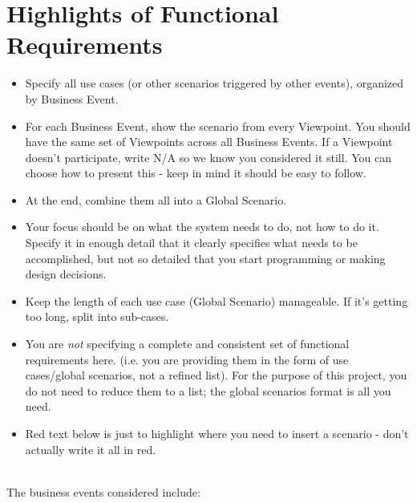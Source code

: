 \documentclass[]{article}
\begin{document}
\section{Highlights of Functional Requirements}
\label{sec:functional_requirements}
\begin{itemize}
	\item Specify all use cases (or other scenarios triggered by other events), organized by Business Event. 
	\item For each Business Event, show the scenario from every Viewpoint. You should have the same set of Viewpoints across all Business Events. If a Viewpoint doesn't participate, write N/A so we know you considered it still. You can choose how to present this - keep in mind it should be easy to follow. 
	\item At the end, combine them all into a Global Scenario.
	\item Your focus should be on what the system needs to do, not how to do it. Specify it in enough detail that it clearly specifies what needs to be accomplished, but not so detailed that you start programming or making design decisions.
	\item Keep the length of each use case (Global Scenario) manageable. If it's getting too long, split into sub-cases.
	\item You are \emph{not} specifying a complete and consistent set of functional requirements here. (i.e. you are providing them in the form of use cases/global scenarios, not a refined list). For the purpose of this project, you do not need to reduce them to a list; the global scenarios format is all you need.
	\item Red text below is just to highlight where you need to insert a scenario - don't actually write it all in red.
\end{itemize}

 \\

\noindent The business events considered include:
\end{document}
